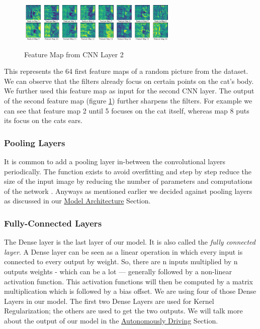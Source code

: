 \documentclass[journal]{IEEEtran}
\begin{document}
\begin{figure}
  \begin{center}
  \includegraphics[width=3in]{photo/feature_map2.png}\\
  \caption{Feature Map from CNN Layer 2}\label{featuremap2}
  \end{center}
\end{figure}

This represents the 64 first feature maps of a random picture from the dataset. We can observe that the filters already focus on certain points on the cat's body. We further used this feature map as input for the second CNN layer. The output of the second feature map (figure \ref{featuremap2}) further sharpens the filters. For example we can see that feature map 2 until 5 focuses on the cat itself, whereas map 8 puts its focus on the cats ears. \\

\subsubsection{Pooling Layers}
\noindent It is common to add a pooling layer in-between the convolutional layers periodically. The function exists to avoid overfitting and step by step reduce the size of the input image by reducing the number of parameters and computations of the network \cite{RN2}. Anyways as mentioned earlier we decided against pooling layers as discussed in our \hyperref[subsec:ModelArchitecture]{Model Architecture} Section.\\
\subsubsection{Fully-Connected Layers}
\noindent The Dense layer is the last layer of our model. It is also called the \textit{fully connected layer}.  A Dense layer can be seen as a linear operation in which every input is connected to every output by weight. So, there are n inputs multiplied by n outputs weights - which can be a lot — generally followed by a non-linear activation function. This activation functions will then be computed by a matrix multiplication which is followed by a bias offset. 
We are using four of those Dense Layers in our model. The first two Dense Layers are used for Kernel Regularization; the others are used to get the two outputs. We will talk more about the output of our model in the \hyperref[sec:AutonomouslyDriving]{Autonomously Driving} Section. \\
\end{document}
